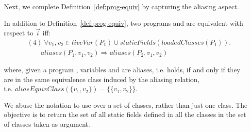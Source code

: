 \documentclass[sigconf,review,anonymous]{acmart}
\begin{document}
Next, we complete Definition~\ref{def:prog-equiv} by capturing the aliasing aspect.

\begin{definition}\label{def:prog-equiv-add}
   In addition to Definition~\ref{def:prog-equiv},
  two programs  and  are equivalent
  with respect to $\vec{i}$ iff:
\[
    \begin{aligned}
      & (4)~ \forall v_1,v_2 \in liveVar(P_1) \cup staticFields(loadedClasses(P_1)). \\
      & \qquad aliases(P_1, v_1, v_2) \Rightarrow aliases(P_2, v_1,v_2)      
    \end{aligned}
    \]
   
  \end{definition}

where, given a program , variables  and  are aliases, i.e.  holds,
if and only if they are in the same equivalence class induced by the aliasing relation,\\
  i.e. $aliasEquivClass(\{v_1,v_2\}) = \{\{v_1,v_2\}\}$.

  We abuse the notation to use  over a set of classes, rather than just one class.
  The objective is to return the set of all static fields defined in all the classes in the set of classes taken as argument.
  





\end{document}

